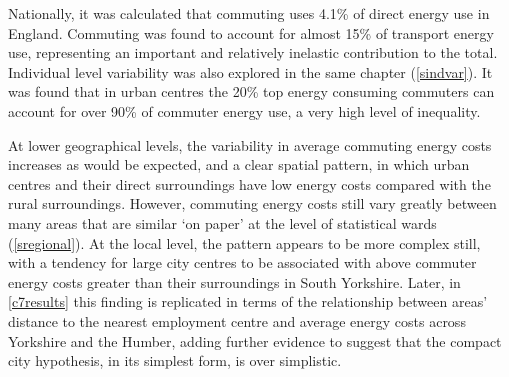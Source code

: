 Nationally, it was calculated that
commuting uses 4.1\% of direct energy use in England. Commuting was found to
account for almost 15\% of transport energy use, representing an
important and relatively inelastic contribution to the total.
Individual level variability was also explored in the
same chapter (\cref{sindvar}). It was found that in urban centres
the 20\% top energy consuming commuters can account for over 90\% of commuter
energy use, a very high level of inequality.

At lower geographical levels, the variability in average commuting energy
costs increases as would be expected, and a clear spatial pattern, in which
urban centres and their direct surroundings have low energy costs compared
with the rural surroundings. However, commuting energy costs still vary
greatly between many areas that are similar `on paper' at the level of
statistical wards (\cref{sregional}). At the local level, the pattern appears
to be more complex still, with a tendency for large city centres to be associated
with above commuter energy costs greater than their surroundings in South
Yorkshire. Later, in \cref{c7results} this finding is replicated in terms
of the relationship between areas' distance to the nearest employment
centre and average energy costs across Yorkshire and the Humber, adding
further evidence to suggest that the compact city hypothesis, in its simplest
form, is over simplistic. 

